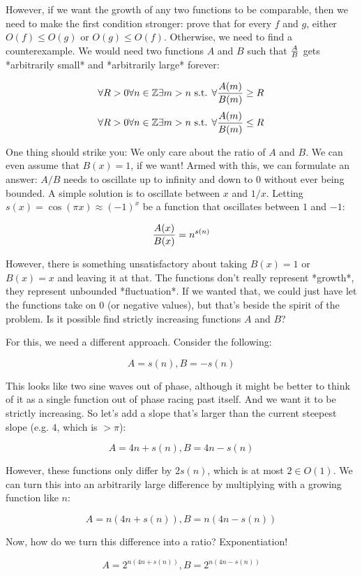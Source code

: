 \documentclass[11pt]{amsart}
\begin{document}
However, if we want the growth of any two functions to be comparable, then we need to make the first condition stronger: prove that for every $f$ and $g$, either $O(f) \leq O(g)$ or $O(g) \leq O(f)$. Otherwise, we need to find a counterexample. We would need two functions $A$ and $B$ such that ${A \over B}$ gets *arbitrarily small* and *arbitrarily large* forever:

$$\forall R>0 \forall n\in\mathbb{Z} \exists m>n \text{ s.t. }\forall {A(m) \over B(m)} \geq R$$
$$\forall R>0 \forall n\in\mathbb{Z} \exists m>n \text{ s.t. }\forall {A(m) \over B(m)} \leq R$$

One thing should strike you: We only care about the ratio of $A$ and $B$. We can even assume that $B(x) = 1$, if we want! Armed with this, we can formulate an answer: $A/B$ needs to oscillate up to infinity and down to $0$ without ever being bounded. A simple solution is to oscillate between $x$ and $1/x$. Letting $s(x) = \cos(\pi x) \approx (-1)^x$ be a function that oscillates between $1$ and $-1$:

$${A(x) \over B(x)} = n^{s(n)}$$

However, there is something unsatisfactory about taking $B(x) = 1$ or $B(x) = x$ and leaving it at that. The functions don't really represent *growth*, they represent unbounded *fluctuation*. If we wanted that, we could just have let the functions take on $0$ (or negative values), but that's beside the spirit of the problem. Is it possible find strictly increasing functions $A$ and $B$?

For this, we need a different approach. Consider the following:

$$A = s(n), B = -s(n)$$

This looks like two sine waves out of phase, although it might be better to think of it as a single function out of phase racing past itself. And we want it to be strictly increasing. So let's add a slope that's larger than the current steepest slope (e.g. $4$, which is $> \pi$):

$$A = 4n+s(n), B = 4n-s(n)$$

However, these functions only differ by $2 s(n)$, which is at most $2 \in O(1)$. We can turn this into an arbitrarily large difference by multiplying with a growing function like $n$:

$$A = n \left(4n + s(n)\right), B = n \left(4n - s(n)\right)$$

Now, how do we turn this difference into a ratio? Exponentiation!

$$A = 2^{n \left(4n + s(n)\right)}, B = 2^{n \left(4n - s(n)\right)}$$
\end{document}
